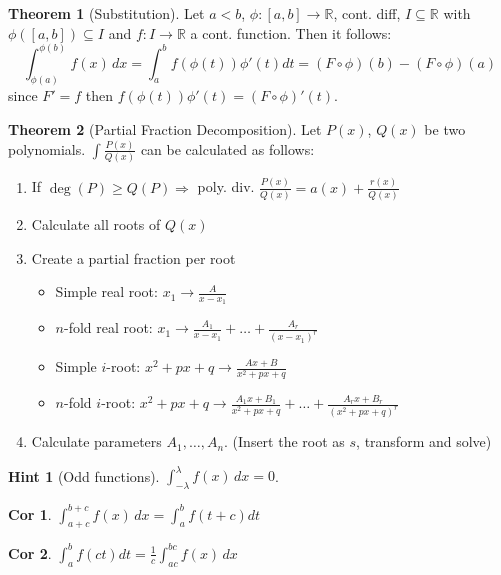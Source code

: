 \documentclass[a4paper, 10pt]{article}
\newtheorem*{corollary}{Cor}
\theoremstyle{definition}
\newtheorem*{note_wrapper}{Hint}
\theoremstyle{ex}
\theoremstyle{named}
\newtheorem*{ntheorem_wrapper}{Theorem}
\newenvironment{ntheorem}%
    {\begin{mdframed}[style=important]\begin{ntheorem_wrapper}}%
    {\end{ntheorem_wrapper}\end{mdframed}}
\newenvironment{note}%
    {\begin{mdframed}[style=trick]\begin{note_wrapper}}%
    {\end{note_wrapper}\end{mdframed}}
\newcommand{\R}{\mathbb{R}}
\begin{document}
\begin{ntheorem}[Substitution]
    Let $a < b$, $\phi: [a, b] \to \R$, cont. diff, $I \subseteq \R$ with $\phi([a, b]) \subseteq I$ and $f: I \to \R$ a cont. function. Then it follows:
    $$\int_{\phi(a)}^{\phi(b)} f(x) \,dx = \int_a^b f(\phi(t)) \phi'(t) dt = (F \circ \phi)(b) - (F \circ \phi)(a)$$
    since $F'=f$ then $f(\phi(t))\phi'(t) = (F \circ \phi)'(t)$.
\end{ntheorem}

\begin{ntheorem}[Partial Fraction Decomposition]
    Let $P(x)$, $Q(x)$ be two polynomials. $\int \frac{P(x)}{Q(x)}$ can be calculated as follows:
    \begin{enumerate}[leftmargin=5mm]
        \item If $\deg(P) \geq Q(P) \Rightarrow$ poly. div. $\frac{P(x)}{Q(x)} = a(x) + \frac{r(x)}{Q(x)}$
        \item Calculate all roots of $Q(x)$
        \item Create a partial fraction per root
        \begin{itemize}[leftmargin=1mm]
            \item Simple real root: $x_1 \to \frac{A}{x - x_1}$
            \item $n$-fold real root: $x_1 \to \frac{A_1}{x - x_1} + \ldots + \frac{A_r}{(x - x_1)^r}$
            \item Simple $i$-root: $x^2 + px + q \to \frac{Ax + B}{x^2 + px + q}$
            \item $n$-fold $i$-root: $x^2 + px + q \to \frac{A_1x + B_1}{x^2 + px + q} + \ldots + \frac{A_rx + B_r}{(x^2 + px + q)^r}$
        \end{itemize}
        \item Calculate parameters $A_1, \ldots, A_n$. (Insert the root as $s$, transform and solve)
    \end{enumerate}
\end{ntheorem}

\begin{note}[Odd functions]
    $\int_{-\lambda}^\lambda f(x) \, dx = 0$.
\end{note}

\begin{corollary}
    $\int_{a + c}^{b + c} f(x) \,dx = \int_a^b f(t + c) dt$
\end{corollary}

\begin{corollary}
    $\int_a^b f(ct) dt = \frac{1}{c} \int_{ac}^{bc} f(x) \,dx$
\end{corollary}
\end{document}

